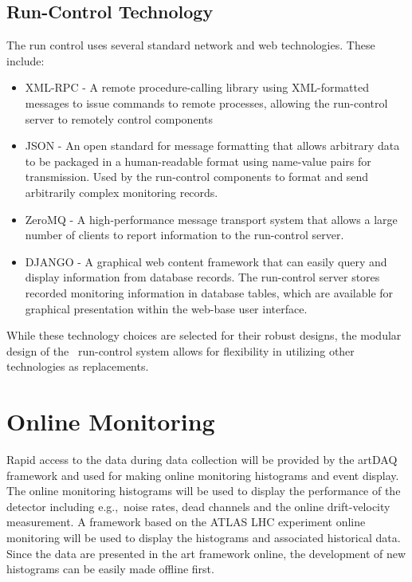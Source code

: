 \subsection{Run-Control Technology}
The run control uses several standard network and
web technologies.  These include:
\begin{itemize}
\item{XML-RPC - A remote procedure-calling library using XML-formatted 
messages to issue commands to remote processes, allowing
    the run-control server to remotely control components}
\item{JSON - An open standard for message formatting that allows
    arbitrary data to be packaged in a human-readable format using
    name-value pairs for transmission.  Used by the run-control
    components to format and send arbitrarily complex monitoring
    records.}
\item{ZeroMQ - A high-performance message transport system that allows
    a large number of clients to report information to the run-control
    server.}
\item{DJANGO - A graphical web content framework that can easily query
    and display information from database records.  The run-control server
    stores recorded monitoring information in database tables, which
    are available for graphical presentation within the web-base user
    interface.}
\end{itemize}
While these technology choices are selected for their robust designs,
the modular design of the \LBNE\ run-control system allows for
flexibility in utilizing other technologies as replacements.

\section{Online Monitoring}
\label{sec:daq_om}

Rapid access to the data during data collection will be provided by
the artDAQ framework and used for making online monitoring histograms
and event display.  The online monitoring histograms will be used to
display the performance of the detector including e.g.,\ noise rates,
dead channels and the online drift-velocity measurement.  A framework
based on the ATLAS LHC experiment online monitoring will be used to
display the histograms and associated historical data.  Since the
data are presented in the art framework online, the development of new
histograms can be easily made offline first.

